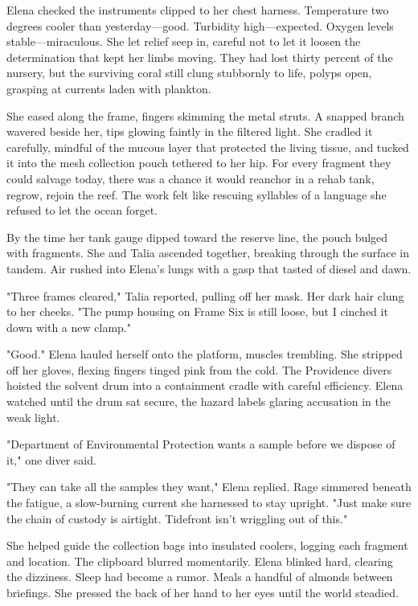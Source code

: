 Elena checked the instruments clipped to her chest harness. Temperature two degrees cooler than yesterday—good. Turbidity high—expected. Oxygen levels stable—miraculous. She let relief seep in, careful not to let it loosen the determination that kept her limbs moving. They had lost thirty percent of the nursery, but the surviving coral still clung stubbornly to life, polyps open, grasping at currents laden with plankton.

She eased along the frame, fingers skimming the metal struts. A snapped branch wavered beside her, tips glowing faintly in the filtered light. She cradled it carefully, mindful of the mucous layer that protected the living tissue, and tucked it into the mesh collection pouch tethered to her hip. For every fragment they could salvage today, there was a chance it would reanchor in a rehab tank, regrow, rejoin the reef. The work felt like rescuing syllables of a language she refused to let the ocean forget.

By the time her tank gauge dipped toward the reserve line, the pouch bulged with fragments. She and Talia ascended together, breaking through the surface in tandem. Air rushed into Elena's lungs with a gasp that tasted of diesel and dawn.

"Three frames cleared," Talia reported, pulling off her mask. Her dark hair clung to her cheeks. "The pump housing on Frame Six is still loose, but I cinched it down with a new clamp."

"Good." Elena hauled herself onto the platform, muscles trembling. She stripped off her gloves, flexing fingers tinged pink from the cold. The Providence divers hoisted the solvent drum into a containment cradle with careful efficiency. Elena watched until the drum sat secure, the hazard labels glaring accusation in the weak light.

"Department of Environmental Protection wants a sample before we dispose of it," one diver said.

"They can take all the samples they want," Elena replied. Rage simmered beneath the fatigue, a slow-burning current she harnessed to stay upright. "Just make sure the chain of custody is airtight. Tidefront isn't wriggling out of this."

She helped guide the collection bags into insulated coolers, logging each fragment and location. The clipboard blurred momentarily. Elena blinked hard, clearing the dizziness. Sleep had become a rumor. Meals a handful of almonds between briefings. She pressed the back of her hand to her eyes until the world steadied.


